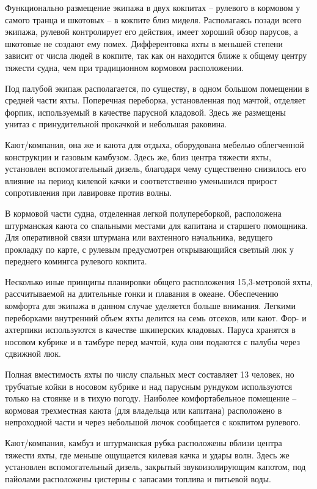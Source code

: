 \documentclass[a4paper, 12pt, twoside, final, book, russian, fittopage, cyremdash]{ncc}
\begin{document}
Функционально размещение экипажа в двух кокпитах \--- рулевого в кормовом у самого транца и шкотовых \--- в кокпите близ миделя. Располагаясь позади всего экипажа, рулевой контролирует его действия, имеет хороший обзор парусов, а шкотовые не создают ему помех. Дифферентовка яхты в меньшей степени зависит от числа людей в кокпите, так как он находится ближе к общему центру тяжести судна, чем при традиционном кормовом расположении.

Под палубой экипаж располагается, по существу, в одном большом помещении в средней части яхты. Поперечная переборка, установленная под мачтой, отделяет форпик, используемый в качестве парусной кладовой. Здесь же размещены унитаз с принудительной прокачкой и небольшая раковина. 

Кают\-/компания, она же и каюта для отдыха, оборудована мебелью облегченной конструкции и газовым камбузом. Здесь же, близ центра тяжести яхты, установлен вспомогательный дизель, благодаря чему существенно снизилось его влияние на период килевой качки и соответственно уменьшился прирост сопротивления при лавировке против волны.

В кормовой части судна, отделенная легкой полупереборкой, расположена штурманская каюта со спальными местами для капитана и старшего помощника. Для оперативной связи штурмана или вахтенного начальника, ведущего прокладку по карте, с рулевым предусмотрен открывающийся светлый люк у переднего комингса рулевого кокпита.

Несколько иные принципы планировки общего расположения 15,3\--метровой яхты, рассчитываемой на длительные гонки и плавания в океане. Обеспечению комфорта для экипажа в данном случае уделяется больше внимания. Легкими переборками внутренний объем яхты делится на семь отсеков, или кают. Фор\-- и ахтерпики используются в качестве шкиперских кладовых. Паруса хранятся в носовом кубрике и в тамбуре перед мачтой, куда они подаются с палубы через сдвижной люк. 

Полная вместимость яхты по числу спальных мест составляет 13 человек, но трубчатые койки в носовом кубрике и над парусным рундуком используются только на стоянке и в тихую погоду. Наиболее комфортабельное помещение \--- кормовая трехместная каюта (для владельца или капитана) расположено в непроходной части и через небольшой лючок сообщается с кокпитом рулевого.

Кают\-/компания, камбуз и штурманская рубка расположены вблизи центра тяжести яхты, где меньше ощущается килевая качка и удары волн. Здесь же установлен вспомогательный дизель, закрытый звукоизолирующим капотом, под пайолами расположены цистерны с запасами топлива и питьевой воды.
\end{document}
